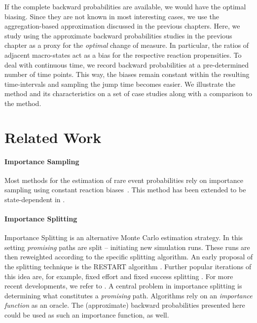 If the complete backward probabilities are available, we would have
the optimal biasing.
Since they are not known in most interesting cases, we use the
aggregation-based approximation discussed in the previous chapters.
Here, we study using the approximate backward probabilities studies
in the previous chapter as a proxy for the \emph{optimal} change of measure.
In particular, the ratios of adjacent macro-states act as a bias for
the respective reaction propensities.
To deal with continuous time, we record backward probabilities at a
pre-determined number of time points.
This way, the biases remain constant within the resulting
time-intervals and sampling the jump time becomes easier.
We illustrate the method and its characteristics on a set of case
studies along with a comparison to the  method.

\section{Related Work}
\paragraph{Importance Sampling}
Most methods for the estimation of rare event probabilities  rely on
importance sampling using constant reaction
biases~\parencite{kuwahara2008efficient,daigle2011automated,chong2017path}.
This method has been extended to be state-dependent in \citet{roh2011state}.

\paragraph{Importance Splitting}
Importance Splitting is an alternative Monte Carlo estimation strategy.
In this setting \emph{promising} paths are split -- initiating new
simulation runs.
These runs are then reweighted according to the specific splitting algorithm.
An early proposal of the splitting technique is the \ac{RESTART}
algorithm \parencite{villen1994restart}.
Further popular iterations of this idea are, for example, fixed
effort and fixed success splitting \parencite{garvels1998comparison}.
For more recent developments, we refer to
\parencite{budde2017better,jegourel2013importance}.
A central problem in importance splitting is determining what
constitutes a \emph{promising} path.
Algorithms rely on an \emph{importance function} as an oracle.
The (approximate) backward probabilities presented here could be used
as such an importance function, as well.

